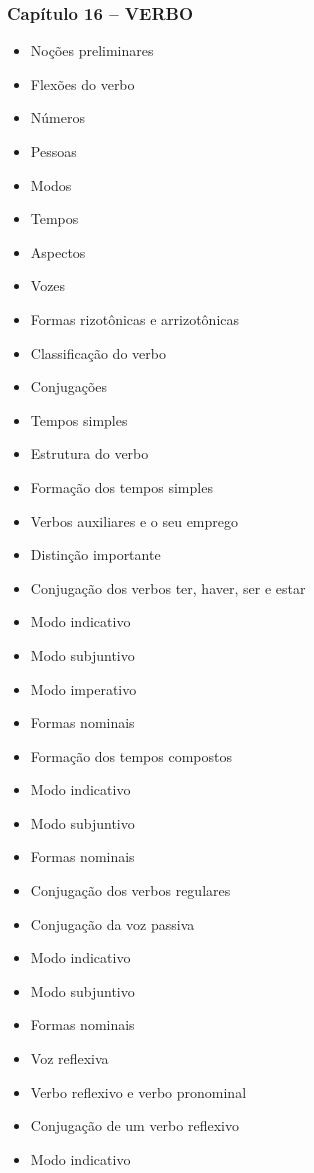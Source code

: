 \documentclass[a4paper,12pt]{article}[abntex2]
\begin{document}
\subsubsection*{Capítulo 16 – VERBO}
\begin{itemize}
    \item Noções preliminares
    \item Flexões do verbo
    \item Números
    \item Pessoas
    \item Modos
    \item Tempos
    \item Aspectos
    \item Vozes
    \item Formas rizotônicas e arrizotônicas
    \item Classificação do verbo
    \item Conjugações
    \item Tempos simples
    \item Estrutura do verbo
    \item Formação dos tempos simples
    \item Verbos auxiliares e o seu emprego
    \item Distinção importante
    \item Conjugação dos verbos ter, haver, ser e estar
    \item Modo indicativo
    \item Modo subjuntivo
    \item Modo imperativo
    \item Formas nominais
    \item Formação dos tempos compostos
    \item Modo indicativo
    \item Modo subjuntivo
    \item Formas nominais
    \item Conjugação dos verbos regulares
    \item Conjugação da voz passiva
    \item Modo indicativo
    \item Modo subjuntivo
    \item Formas nominais
    \item Voz reflexiva
    \item Verbo reflexivo e verbo pronominal
    \item Conjugação de um verbo reflexivo
    \item Modo indicativo

\end{itemize}
\end{document}
